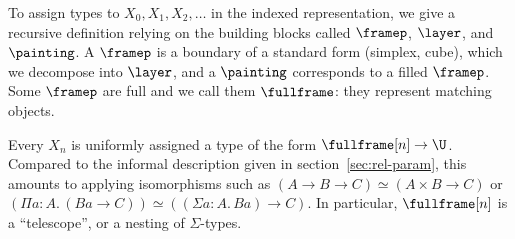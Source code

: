 \documentclass{msc}
\begin{document}
To assign types to $X_0, X_1, X_2, \ldots$ in the indexed representation, we give a recursive definition relying on the building blocks called $\framep$, $\layer$, and $\painting$. A $\framep$ is a boundary of a standard form (simplex, cube), which we decompose into $\layer$, and a $\painting$ corresponds to a filled $\framep$. Some $\framep$ are full and we call them $\fullframe$: they represent matching objects.

Every $X_n$ is uniformly assigned a type of the form $\fullframe[n] \rightarrow \U$. Compared to the informal description given in section~\ref{sec:rel-param}, this amounts to applying isomorphisms such as $(A \rightarrow B \rightarrow C) \simeq (A \times B \rightarrow C)$ or $(\Pi a: A.\, (B a \rightarrow C)) \simeq ((\Sigma a: A.\, B a) \rightarrow C)$. In particular, $\fullframe[n]$ is a ``telescope'', or a nesting of $\Sigma$-types.
\end{document}
